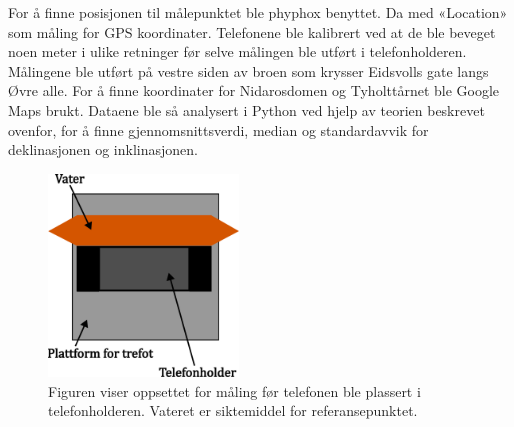 For å finne posisjonen til målepunktet ble phyphox benyttet. Da med «Location» som måling for GPS koordinater. Telefonene ble kalibrert ved at de ble beveget noen meter i ulike retninger før selve målingen ble utført i telefonholderen. Målingene ble utført på vestre siden av broen som krysser Eidsvolls gate langs Øvre alle. 
For å finne koordinater for Nidarosdomen og Tyholttårnet ble Google Maps brukt.
Dataene ble så analysert i Python ved hjelp av teorien beskrevet ovenfor, for å finne gjennomsnittsverdi, median og standardavvik for deklinasjonen og inklinasjonen.     

 
\begin{figure}
    \centering
    \includegraphics[width=0.45\textwidth]{img/Plattform med vater.pdf}                 
    \caption{Figuren viser oppsettet for måling før telefonen ble plassert i telefonholderen. Vateret er siktemiddel for referansepunktet.
        }
    \label{fig:med_vater}
\end{figure}